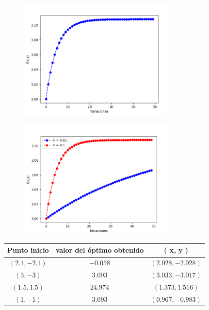 \documentclass[size=a4, parskip=half, titlepage=false, toc=flat, toc=bib, 12pt]{scrartcl}
\begin{document}
\begin{figure}[H]
\centering
\includegraphics[width=0.7\textwidth]{./img/bonus22}
\end{figure}

\begin{figure}[H]
\centering
\includegraphics[width=0.7\textwidth]{./img/bonus23}
\end{figure}

\begin{table}[H]
\centering
\begin{tabular}{ccc}
\hline
Punto inicio   & valor del óptimo obtenido                    & ( x, y )                                 \\ \hline
$(2.1 , -2.1)$ & {\color[HTML]{000000} $-0.058$} & {\color[HTML]{000000} $(2.028, -2.028)$} \\ \hline
$(3, -3)$      & {\color[HTML]{000000} $3.093$}  & {\color[HTML]{000000} $(3.033, -3.017)$} \\ \hline
$(1.5, 1.5)$   & {\color[HTML]{000000} $24.974$} & {\color[HTML]{000000} $(1.373, 1.516)$}  \\ \hline
$(1, -1)$      & {\color[HTML]{000000} $3.093$}  & {\color[HTML]{000000} $(0.967, -0.983)$} \\ \hline
\end{tabular}
\end{table}

\end{document}
